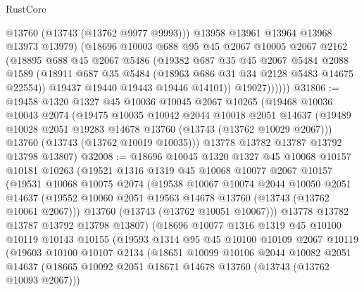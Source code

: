 \begin{lexlean}{RustCore}
\begin{coremodule}
                  @13760
                  (@13743 (@13762 @9977 @9993)))
                @13958
                @13961
                @13964
                @13968
                @13973
                @13979)
              (@18696
                @10003
                @688
                @95
                @45
                @2067
                @10005
                @2067
                @2162
                (@18895
                  @688
                  @45
                  @2067
                  @5486
                  (@19382
                    @687
                    @35
                    @45
                    @2067
                    @5484
                    @2088
                    @1589
                    (@18911 @687 @35 @5484 (@18963 @686 @31 @34 @2128 @5483 @14675 @22554))
                    @19437
                    @19440
                    @19443
                    @19446
                    @14101))
                @19027))))))
@31806 := @19458
    @1320
    @1327
    @45
    @10036
    @10045
    @2067
    @10265
    (@19468
      @10036
      @10043
      @2074
      (@19475
        @10035
        @10042
        @2044
        @10018
        @2051
        @14637
        (@19489 @10028 @2051 @19283 @14678 @13760 (@13743 (@13762 @10029 @2067)))
        @13760
        (@13743 (@13762 @10019 @10035)))
      @13778
      @13782
      @13787
      @13792
      @13798
      @13807)
@32008 := @18696
    @10045
    @1320
    @1327
    @45
    @10068
    @10157
    @10181
    @10263
    (@19521
      @1316
      @1319
      @45
      @10068
      @10077
      @2067
      @10157
      (@19531
        @10068
        @10075
        @2074
        (@19538
          @10067
          @10074
          @2044
          @10050
          @2051
          @14637
          (@19552 @10060 @2051 @19563 @14678 @13760 (@13743 (@13762 @10061 @2067)))
          @13760
          (@13743 (@13762 @10051 @10067)))
        @13778
        @13782
        @13787
        @13792
        @13798
        @13807)
      (@18696
        @10077
        @1316
        @1319
        @45
        @10100
        @10119
        @10143
        @10155
        (@19593
          @1314
          @95
          @45
          @10100
          @10109
          @2067
          @10119
          (@19603
            @10100
            @10107
            @2134
            (@18651
              @10099
              @10106
              @2044
              @10082
              @2051
              @14637
              (@18665 @10092 @2051 @18671 @14678 @13760 (@13743 (@13762 @10093 @2067)))

\end{coremodule}
\end{lexlean}
